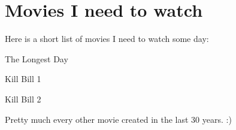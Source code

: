 \documentclass[letterpaper,11pt]{report}
\newenvironment{packed_enum}{
\begin{enumerate}
  \setlength{\itemsep}{0pt}
  \setlength{\parskip}{0pt}
  \setlength{\parsep}{0pt}
}{\end{enumerate}}
\begin{document}
\chapter{Movies I need to watch}

Here is a short list of movies I need to watch some day:

\begin{packed_enum}
   \item The Longest Day
   \item Kill Bill 1
   \item Kill Bill 2
   \item Pretty much every other movie created in the last 30 years. :)
\end{packed_enum}
\end{document}
